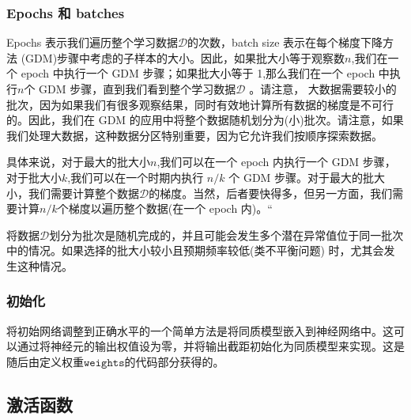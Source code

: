 \documentclass[
]{article}
\newenvironment{Shaded}{\begin{snugshade}}{\end{snugshade}}
\newcommand{\CommentTok}[1]{\textcolor[rgb]{0.56,0.35,0.01}{\textit{#1}}}
\newcommand{\FunctionTok}[1]{\textcolor[rgb]{0.13,0.29,0.53}{\textbf{#1}}}
\newcommand{\NormalTok}[1]{#1}
\newcommand{\OtherTok}[1]{\textcolor[rgb]{0.56,0.35,0.01}{#1}}
\newcommand{\SpecialCharTok}[1]{\textcolor[rgb]{0.81,0.36,0.00}{\textbf{#1}}}
\begin{document}
\subsubsection{Epochs 和 batches}\label{epochs-ux548c-batches}

Epochs 表示我们遍历整个学习数据\(\mathcal{D}\)的次数，batch size
表示在每个梯度下降方法
(GDM)步骤中考虑的子样本的大小。因此，如果批大小等于观察数\(n\),我们在一个
epoch 中执行一个 GDM 步骤；如果批大小等于 1,那么我们在一个 epoch
中执行\(n\)个 GDM 步骤，直到我们看到整个学习数据\(\mathcal{D}\)
。请注意，
大数据需要较小的批次，因为如果我们有很多观察结果，同时有效地计算所有数据的梯度是不可行的。因此，我们在
GDM
的应用中将整个数据随机划分为(小)批次。请注意，如果我们处理大数据，这种数据分区特别重要，因为它允许我们按顺序探索数据。

具体来说，对于最大的批大小\(n\),我们可以在一个 epoch 内执行一个 GDM
步骤，对于批大小\(k\),我们可以在一个时期内执行 \(n/k\) 个 GDM
步骤。对于最大的批大小，我们需要计算整个数据\(\mathcal{D}\)的梯度。当然，后者要快得多，但另一方面，我们需要计算\(n/k\)个梯度以遍历整个数据(在一个
epoch 内)。``

将数据\(\mathcal{D}\)划分为批次是随机完成的，并且可能会发生多个潜在异常值位于同一批次中的情况。如果选择的批大小较小且预期频率较低(类不平衡问题)
时，尤其会发生这种情况。

\subsubsection{初始化}\label{ux521dux59cbux5316}

将初始网络调整到正确水平的一个简单方法是将同质模型嵌入到神经网络中。这可以通过将神经元的输出权值设为零，并将输出截距初始化为同质模型来实现。这是随后由定义权重\(\mathtt{weights}\)的代码部分获得的。

\begin{Shaded}
\end{Shaded}

\subsection{激活函数}\label{ux6fc0ux6d3bux51fdux6570}
\end{document}

